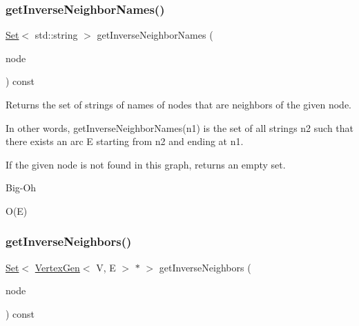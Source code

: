 \subsubsection{\texorpdfstring{get\+Inverse\+Neighbor\+Names()}{getInverseNeighborNames()}\hspace{0.1cm}{\footnotesize\ttfamily [2/2]}}
{\footnotesize\ttfamily \mbox{\hyperlink{classSet}{Set}}$<$ std\+::string $>$ get\+Inverse\+Neighbor\+Names (\begin{DoxyParamCaption}\item[{const std\+::string \&}]{node }\end{DoxyParamCaption}) const\hspace{0.3cm}{\ttfamily [inherited]}}



Returns the set of strings of names of nodes that are neighbors of the given node. 

In other words, get\+Inverse\+Neighbor\+Names(n1) is the set of all strings n2 such that there exists an arc E starting from n2 and ending at n1.

If the given node is not found in this graph, returns an empty set. \begin{DoxyRefDesc}{Big-\/\+Oh}
\item[\mbox{\hyperlink{BigOh__BigOh000068}{Big-\/\+Oh}}]O(\+E) \end{DoxyRefDesc}
\mbox{\label{classGraph_a80a5724c594b9bd0b6008c57b09af317}} 
\subsubsection{\texorpdfstring{get\+Inverse\+Neighbors()}{getInverseNeighbors()}\hspace{0.1cm}{\footnotesize\ttfamily [1/2]}}
{\footnotesize\ttfamily \mbox{\hyperlink{classSet}{Set}}$<$ \mbox{\hyperlink{classVertexGen}{Vertex\+Gen}}$<$ V, E $>$  $\ast$ $>$ get\+Inverse\+Neighbors (\begin{DoxyParamCaption}\item[{\mbox{\hyperlink{classVertexGen}{Vertex\+Gen}}$<$ V, E $>$  $\ast$}]{node }\end{DoxyParamCaption}) const\hspace{0.3cm}{\ttfamily [inherited]}}



